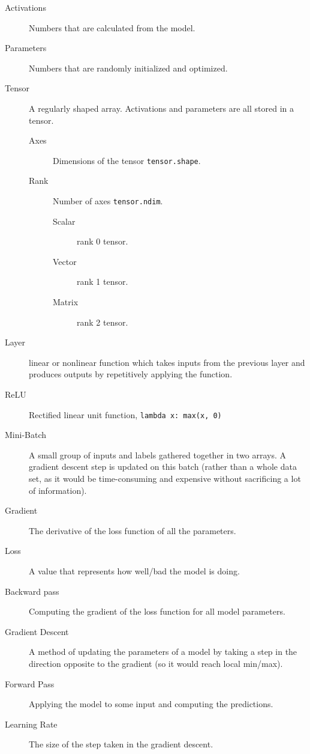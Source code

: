\documentclass{article}
\begin{document}
\begin{description}
    \item[Activations] Numbers that are calculated from the model.
    \item[Parameters] Numbers that are randomly initialized and optimized.
    \item[Tensor] A regularly shaped array. Activations and parameters are all stored
        in a tensor.
        \begin{description}
            \item[Axes] Dimensions of the tensor \verb!tensor.shape!.
            \item[Rank] Number of axes \verb!tensor.ndim!.
                \begin{description}
                    \item[Scalar] rank 0 tensor.
                    \item[Vector] rank 1 tensor.
                    \item[Matrix] rank 2 tensor.
                \end{description}
        \end{description}
    \item[Layer] linear or nonlinear function which takes inputs from the previous layer and
        produces outputs by repetitively applying the function.
    \item[ReLU] Rectified linear unit function, \verb!lambda x: max(x, 0)!
    \item[Mini-Batch] A small group of inputs and labels gathered together in two
        arrays. A gradient descent step is updated on this batch (rather than a whole data
        set, as it would be time-consuming and expensive without sacrificing a lot of
        information).
    \item[Gradient] The derivative of the loss function of all the parameters.
    \item[Loss] A value that represents how well/bad the model is doing.
    \item[Backward pass] Computing the gradient of the loss function for
        all model parameters.
    \item[Gradient Descent] A method of updating the parameters of a model by taking a
        step in the direction opposite to the gradient (so it would reach local min/max).
    \item[Forward Pass] Applying the model to some input and computing the predictions.
    \item[Learning Rate] The size of the step taken in the gradient descent.
\end{description}
\end{document}
